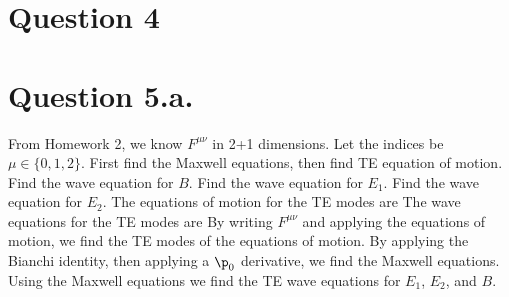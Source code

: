 \documentclass{article}
\begin{document}
\section*{Question 4}
\section*{Question 5.a.}
From Homework 2, we know $F^{\mu\nu}$ in 2+1 dimensions. Let the indices be $\mu\in\{0,1,2\}$. First find the Maxwell equations, then find TE equation of motion.
Find the wave equation for $B$.
Find the wave equation for $E_1$.
Find the wave equation for $E_2$.
The equations of motion for the TE modes are
The wave equations for the TE modes are
By writing $F^{\mu\nu}$ and applying the equations of motion, we find the TE modes of the equations of motion. By applying the Bianchi identity, then applying a $\p_0$ derivative, we find the Maxwell equations. Using the Maxwell equations we find the TE wave equations for $E_1$, $E_2$, and $B$.
\end{document}
